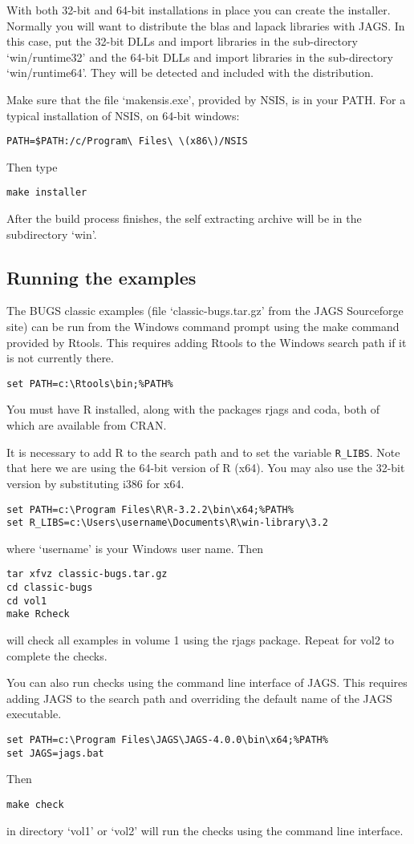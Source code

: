\documentclass[11pt, a4paper, titlepage]{article}
\newcommand{\JAGS}{\textsf{JAGS}}
\newcommand{\R}{\textsf{R}}
\newcommand{\code}[1]{{\bgroup{\normalfont\ttfamily #1}\egroup}}
\newcommand{\file}[1]{{`\normalfont\textsf{#1}'}}
\let\command=\code
\begin{document}
With both 32-bit and 64-bit installations in place you can create the
installer.  Normally you will want to distribute the blas and lapack
libraries with JAGS.  In this case, put the 32-bit DLLs and import
libraries in the sub-directory \file{win/runtime32} and the 64-bit
DLLs and import libraries in the sub-directory
\file{win/runtime64}. They will be detected and included with the
distribution.

Make sure that the file \file{makensis.exe}, provided by
NSIS, is in your PATH. For a typical installation of NSIS, on 64-bit
windows:
\begin{verbatim}
PATH=$PATH:/c/Program\ Files\ \(x86\)/NSIS
\end{verbatim}
Then type
\begin{verbatim}
make installer
\end{verbatim}
After the build process finishes, the self extracting archive will be
in the subdirectory \file{win}.

\subsection{Running the examples}

The BUGS classic examples (file \file{classic-bugs.tar.gz} from the JAGS
Sourceforge site) can be run from the Windows command prompt using
the \command{make} command provided by Rtools. This requires adding Rtools
to the Windows search path if it is not currently there.
\begin{verbatim}
set PATH=c:\Rtools\bin;%PATH%
\end{verbatim}
You must have R installed, along with the packages \code{rjags} and
\code{coda}, both of which are available from CRAN.

It is necessary to add R to the search path and to set the variable
\verb+R_LIBS+. Note that here we are using the 64-bit version of R
(\code{x64}). You may also use the 32-bit version by substituting
\code{i386} for \code{x64}.
\begin{verbatim}
set PATH=c:\Program Files\R\R-3.2.2\bin\x64;%PATH%
set R_LIBS=c:\Users\username\Documents\R\win-library\3.2
\end{verbatim}
where \file{username} is your Windows user name. Then
\begin{verbatim}
tar xfvz classic-bugs.tar.gz
cd classic-bugs
cd vol1
make Rcheck
\end{verbatim}
will check all examples in volume 1 using the \code{rjags} package. Repeat
for \code{vol2} to complete the checks.

You can also run checks using the command line interface of JAGS. This
requires adding JAGS to the search path and overriding the default name
of the JAGS executable.
\begin{verbatim}
set PATH=c:\Program Files\JAGS\JAGS-4.0.0\bin\x64;%PATH%
set JAGS=jags.bat
\end{verbatim}
Then
\begin{verbatim}
make check
\end{verbatim}
in directory \file{vol1} or \file{vol2} will run the checks using the
command line interface.
\end{document}
